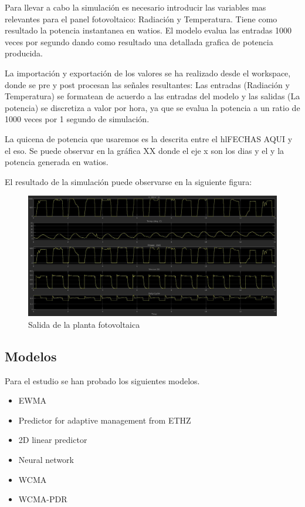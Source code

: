 Para llevar a cabo la simulación es necesario introducir las variables mas relevantes para el panel fotovoltaico: Radiación y Temperatura. Tiene como resultado la potencia instantanea en watios. El modelo evalua las entradas 1000 veces por segundo dando como resultado una detallada grafica de potencia producida.

La importación y exportación de los valores se ha realizado desde el workspace, donde se pre y post procesan las señales resultantes: Las entradas (Radiación y Temperatura) se formatean de acuerdo a las entradas del modelo y las salidas (La potencia) se discretiza a valor por hora, ya que se evalua la potencia a un ratio de 1000 veces por 1 segundo de simulación.

La quicena de potencia que usaremos es la descrita entre el hl{FECHAS AQUI}  y el eso. Se puede observar en la gráfica XX donde el eje x son los dias y el y la potencia generada en watios.

El resultado de la simulación puede observarse en la siguiente figura:

\begin{figure}[h]
    \includegraphics[width=\textwidth]{Model_cur_outputs_010417.jpg}
    \caption{Salida de la planta fotovoltaica}
    \label{fig:Ppv_output}
\end{figure}

\subsection{Modelos}
\label{sub:Modelos}

Para el estudio se han probado los siguientes modelos.

\begin{itemize}
    \item EWMA
    \item Predictor for adaptive management from ETHZ
    \item 2D linear predictor
    \item Neural network
    \item WCMA
    \item WCMA-PDR
\end{itemize}

